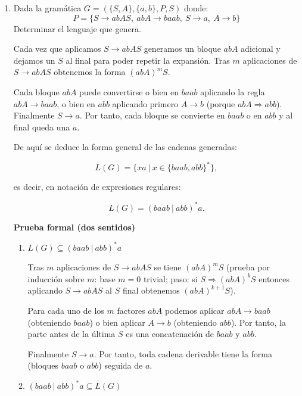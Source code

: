\documentclass[12pt]{report} %
\begin{document}
\begin{enumerate}
\def\labelenumi{\alph{enumi})}
\item
  Dada la gramática \(G = (\{S, A\}, \{a, b\}, P, S)\) donde:\\
  \[P = \{S \to abAS, \ abA \to baab, \ S \to a, \ A \to b\}\]
  Determinar el lenguaje que genera.

  \begin{solucion}[Ejercicio 2.a]

       Cada vez que aplicamos $S \to abAS$ generamos un bloque $abA$ adicional y dejamos un $S$ al final para poder repetir la expansión. Tras $m$ aplicaciones de $S \to abAS$ obtenemos la forma $(abA)^mS$.

       Cada bloque $abA$ puede convertirse o bien en $baab$ aplicando la regla $abA \to baab$, o bien en $abb$ aplicando primero $A \to b$ (porque $abA \Rightarrow abb$). Finalmente $S \to a$. Por tanto, cada bloque se convierte en $baab$ o en $abb$ y al final queda una $a$.

       De aquí se deduce la forma general de las cadenas generadas:

       $$
       L(G) = \{ xa \ | \ x \in \{baab, abb\}^* \},
       $$

       es decir, en notación de expresiones regulares:

       $$
       L(G) = (baab \ | \ abb)^* a.
       $$

       \textbf{Prueba formal (dos sentidos)}

       \begin{enumerate}
           \item $L(G) \subseteq (baab \ | \ abb)^* a$

               Tras $m$ aplicaciones de $S \to abAS$ se tiene $(abA)^mS$ (prueba por inducción sobre $m$: base $m=0$ trivial; paso: si $S \Rightarrow (abA)^kS$ entonces aplicando $S \to abAS$ al $S$ final obtenemos $(abA)^{k+1}S$).

               Para cada uno de los $m$ factores $abA$ podemos aplicar $abA \to baab$ (obteniendo $baab$) o bien aplicar $A \to b$ (obteniendo $abb$). Por tanto, la parte antes de la última $S$ es una concatenación de $baab$ y $abb$.

               Finalmente $S \to a$. Por tanto, toda cadena derivable tiene la forma (bloques $baab$ o $abb$) seguida de $a$.

           \item $(baab \ | \ abb)^* a \subseteq L(G)$


\end{enumerate}
\end{solucion}
\end{enumerate}
\end{document}
